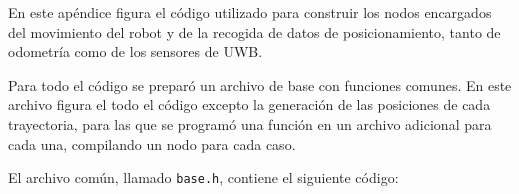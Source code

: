 En este apéndice figura el código utilizado para construir los nodos encargados del movimiento del robot y de la recogida de datos de posicionamiento, tanto de odometría como de los sensores de UWB.

Para todo el código se preparó un archivo de base con funciones comunes.
En este archivo figura el todo el código excepto la generación de las posiciones de cada trayectoria, para las que se programó una función en un archivo adicional para cada una, compilando un nodo para cada caso.

El archivo común, llamado \texttt{base.h}, contiene el siguiente código:

